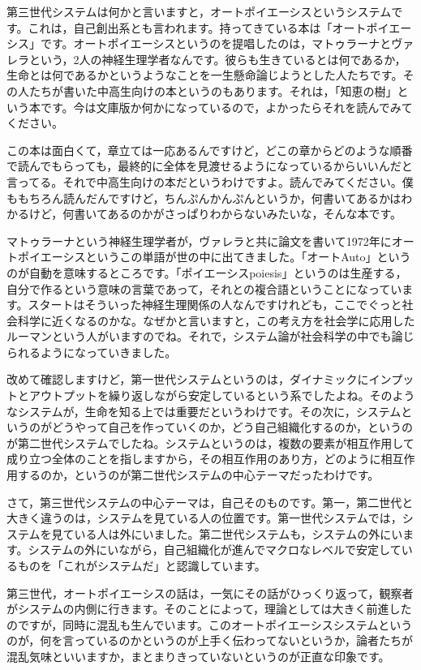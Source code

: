 \documentclass{ltjsbook}
\begin{document}
第三世代システムは何かと言いますと，オートポイエーシスというシステムです。これは，自己創出系とも言われます。持ってきている本は「オートポイエーシス」\parencite{KawamotoHideo}です。オートポイエーシスというのを提唱したのは，マトゥラーナとヴァレラという，2人の神経生理学者なんです。彼らも生きているとは何であるか，生命とは何であるかというようなことを一生懸命論じようとした人たちです。その人たちが書いた中高生向けの本というのもあります。それは，「知恵の樹」という本です\parencite{Chienoki}。今は文庫版か何かになっているので，よかったらそれを読んでみてください。

この本は面白くて，章立ては一応あるんですけど，どこの章からどのような順番で読んでもらっても，最終的に全体を見渡せるようになっているからいいんだと言ってる。それで中高生向けの本だというわけですよ。読んでみてください。僕ももちろん読んだんですけど，ちんぷんかんぷんというか，何書いてあるかはわかるけど，何書いてあるのかがさっぱりわからないみたいな，そんな本です。

マトゥラーナという神経生理学者が，ヴァレラと共に論文を書いて1972年にオートポイエーシスというこの単語が世の中に出てきました。「オートAuto」というのが自動を意味するところです。「ポイエーシスpoiesis」というのは生産する，自分で作るという意味の言葉であって，それとの複合語ということになっています。スタートはそういった神経生理関係の人なんですけれども，ここでぐっと社会科学に近くなるのかな。なぜかと言いますと，この考え方を社会学に応用したルーマンという人がいますのでね。それで，システム論が社会科学の中でも論じられるようになっていきました。

改めて確認しますけど，第一世代システムというのは，ダイナミックにインプットとアウトプットを繰り返しながら安定しているという系でしたよね。そのようなシステムが，生命を知る上では重要だというわけです。その次に，システムというのがどうやって自己を作っていくのか，どう自己組織化するのか，というのが第二世代システムでしたね。システムというのは，複数の要素が相互作用して成り立つ全体のことを指しますから，その相互作用のあり方，どのように相互作用するのか，というのが第二世代システムの中心テーマだったわけです。

さて，第三世代システムの中心テーマは，自己そのものです。第一，第二世代と大きく違うのは，システムを見ている人の位置です。第一世代システムでは，システムを見ている人は外にいました。第二世代システムも，システムの外にいます。システムの外にいながら，自己組織化が進んでマクロなレベルで安定しているものを「これがシステムだ」と認識しています。

第三世代，オートポイエーシスの話は，一気にその話がひっくり返って，観察者がシステムの内側に行きます。そのことによって，理論としては大きく前進したのですが，同時に混乱も生んでいます。このオートポイエーシスシステムというのが，何を言っているのかというのが上手く伝わってないというか，論者たちが混乱気味といいますか，まとまりきっていないというのが正直な印象です。
\end{document}

